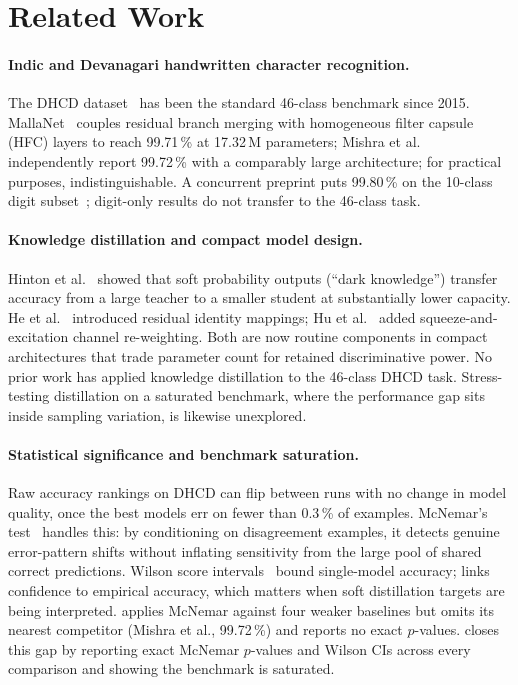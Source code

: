 \section{Related Work}
\label{sec:related}

\paragraph{Indic and Devanagari handwritten character recognition.}
The DHCD dataset~\cite{acharya2015dhcd} has been the standard 46-class benchmark
since 2015. MallaNet~\cite{malla2025} couples residual branch merging with
homogeneous filter capsule (HFC) layers to reach 99.71\,\% at 17.32\,M
parameters; Mishra et al.~\cite{mishra2021} independently report 99.72\,\% with
a comparably large architecture; for practical purposes, indistinguishable.
A concurrent preprint puts 99.80\,\% on the 10-class digit subset~\cite{malla2025digit}; digit-only results do not transfer to the 46-class task.

\paragraph{Knowledge distillation and compact model design.}
Hinton et al.~\cite{hinton2015distill} showed that soft probability
outputs (``dark knowledge'') transfer accuracy from a large teacher to a smaller student
at substantially lower capacity.
He et al.~\cite{he2016identity} introduced residual identity mappings; Hu et al.~\cite{hu2018senet} added squeeze-and-excitation channel re-weighting.
Both are now routine components in compact architectures that trade parameter count for retained discriminative power.
No prior work has applied knowledge distillation to the 46-class DHCD task.
Stress-testing distillation on a saturated benchmark, where the performance gap sits inside sampling variation, is likewise unexplored.

\paragraph{Statistical significance and benchmark saturation.}
Raw accuracy rankings on DHCD can flip between runs with no change in model quality, once the best models err on fewer than 0.3\,\% of examples.
McNemar's test~\cite{mcnemar1947} handles this: by conditioning on disagreement examples, it detects genuine error-pattern shifts without inflating sensitivity from the large pool of shared correct predictions.
Wilson score intervals~\cite{wilson1927} bound single-model accuracy; \cite{guo2017calibration} links confidence to empirical accuracy, which matters when soft distillation targets are being interpreted.
\cite{malla2025} applies McNemar against four weaker baselines
but omits its nearest competitor (Mishra et al., 99.72\,\%) and reports no exact $p$-values.
\modelname{} closes this gap by reporting exact McNemar $p$-values and Wilson
CIs across every comparison and showing the benchmark is saturated.
